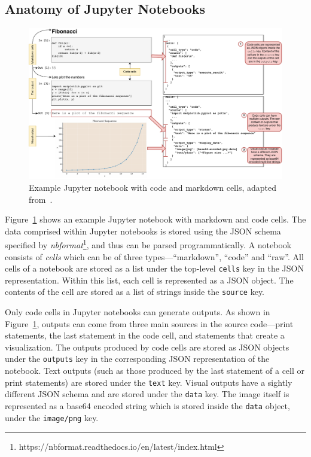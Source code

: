 \documentclass[smallextended]{svjour3}       %
\begin{document}
\subsection{Anatomy of Jupyter Notebooks}

\begin{figure}
	\centering
	\includegraphics[width=\linewidth]{nb.pdf}
	\caption{Example Jupyter notebook with code and markdown cells, adapted from~\citep[Figure~1]{pimentel2019large-scale}.}
	\label{fig:nb}
\end{figure}

Figure~\ref{fig:nb} shows an example Jupyter notebook with markdown and code cells. The data comprised within Jupyter notebooks is stored using the JSON schema specified by \emph{nbformat}\footnote{https://nbformat.readthedocs.io/en/latest/index.html}, and thus can be parsed programmatically. A notebook consists of \emph{cells} which can be of three types---``markdown'', ``code'' and ``raw''. All cells of a notebook are stored as a list under the top-level \lstinline[language={}]$cells$ key in the JSON representation. Within this list, each cell is represented as a JSON object. The contents of the cell are stored as a list of strings inside the \lstinline[language={}]$source$ key.

Only code cells in Jupyter notebooks can generate outputs. As shown in Figure~\ref{fig:nb}, outputs can come from three main sources in the source code---print statements, the last statement in the code cell, and statements that create a visualization. The outputs produced by code cells are stored as JSON objects under the \lstinline[language={}]$outputs$ key in the corresponding JSON representation of the notebook. Text outputs (such as those produced by the last statement of a cell or print statements) are stored under the \lstinline[language={}]$text$ key. Visual outputs have a sightly different JSON schema and are stored under the \lstinline[language={}]$data$ key. The image itself is represented as a base64 encoded string which is stored inside the \lstinline[language={}]$data$ object, under the \lstinline[language={}]$image/png$ key.
\end{document}
